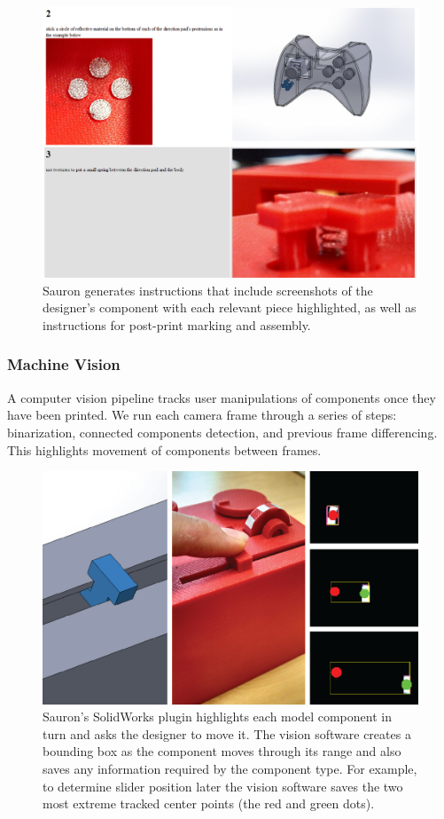 \begin{figure}
\centering
\includegraphics[width=\textwidth]{figures/sauron/directions.PNG}
\caption{Sauron generates instructions that include screenshots of the designer's component with each relevant piece highlighted, as well as instructions for post-print marking and assembly.}
\label{fig:sauron-instructions}
\end{figure}

\subsubsection{Machine Vision}
A computer vision pipeline tracks user manipulations of components once they have been printed.
We run each camera frame through a series of steps: binarization, connected components detection, and previous frame differencing. This highlights movement of components between frames.

\begin{figure}
\centering
\includegraphics[width=\textwidth]{figures/sauron/vision-slider.png}
\caption{Sauron's SolidWorks plugin highlights each model component in turn and asks the designer to move it. The vision software creates a bounding box as the component moves through its range and also saves any information required by the component type. For example, to determine slider position later the vision software saves the two most extreme tracked center points (the red and green dots).}
\label{fig:sauron-vision-process}
\end{figure}

